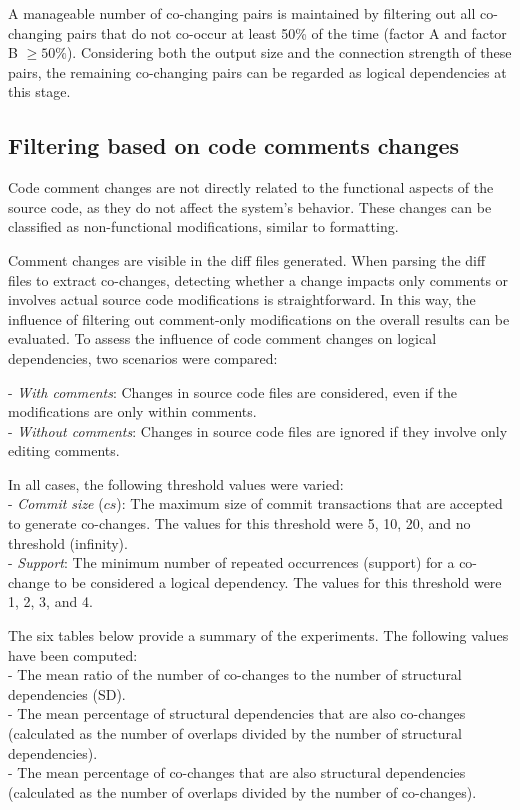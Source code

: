 A manageable number of co-changing pairs is maintained by filtering out all co-changing pairs that do not co-occur at least 50\% of the time (factor A and factor B $\geq 50\%$). Considering both the output size and the connection strength of these pairs, the remaining co-changing pairs can be regarded as logical dependencies at this stage.



\subsection{Filtering based on code comments changes}
\label{subsec:filtering_comments}

\hspace{4em}Code comment changes are not directly related to the functional aspects of the source code, as they do not affect the system's behavior. These changes can be classified as non-functional modifications, similar to formatting.

Comment changes are visible in the diff files generated. When parsing the diff files to extract co-changes, detecting whether a change impacts only comments or involves actual source code modifications is straightforward. In this way, the influence of filtering out comment-only modifications on the overall results can be evaluated. To assess the influence of code comment changes on logical dependencies, two scenarios were compared:

\hspace{-4em}- \textit{With comments}: Changes in source code files are considered, even if the modifications are only within comments. \\  
- \textit{Without comments}: Changes in source code files are ignored if they involve only editing comments.  

\hspace{-4em}In all cases, the following threshold values were varied: \\  
- \textit{Commit size} ($cs$): The maximum size of commit transactions that are accepted to generate co-changes. The values for this threshold were 5, 10, 20, and no threshold (infinity). \\  
- \textit{Support}: The minimum number of repeated occurrences (support) for a co-change to be considered a logical dependency. The values for this threshold were 1, 2, 3, and 4.  

\hspace{-4em}The six tables below provide a summary of the experiments. The following values have been computed: \\  
- The mean ratio of the number of co-changes to the number of structural dependencies (SD). \\  
- The mean percentage of structural dependencies that are also co-changes (calculated as the number of overlaps divided by the number of structural dependencies). \\  
- The mean percentage of co-changes that are also structural dependencies (calculated as the number of overlaps divided by the number of co-changes).  



